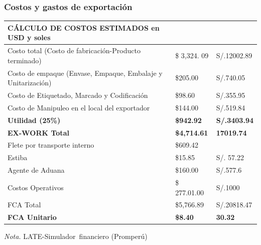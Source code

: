 \documentclass[
  stu,
  floatsintext,
  longtable,
  a4paper,
  nolmodern,
  notxfonts,
  notimes,
  12pt,
  colorlinks=true,linkcolor=blue,citecolor=blue,urlcolor=blue]{apa7}
\newcounter{none} %
\begin{document}
\subsubsection{Costos y gastos de
exportación}\label{costos-y-gastos-de-exportaciuxf3n}

\begin{table}

{\caption{{Cálculo de costos estimados y precio FCA en
USD}{\label{tbl-mytable2}}}}

{\def\LTcaptype{none} %
\begin{longtable}[]{@{}
  >{\raggedright\arraybackslash}p{}
  >{\raggedright\arraybackslash}p{}
  >{\raggedright\arraybackslash}p{}@{}}
\toprule\noalign{}
\begin{minipage}[b]{\linewidth}\raggedright
CÁLCULO DE COSTOS ESTIMADOS en USD y soles
\end{minipage} & \begin{minipage}[b]{\linewidth}\raggedright
\end{minipage} & \begin{minipage}[b]{\linewidth}\raggedright
\end{minipage} \\
\midrule\noalign{}
\endhead
\bottomrule\noalign{}
\endlastfoot
Costo total (Costo de fabricación-Producto terminado) & \$ 3,324. 09 &
S/.12002.89 \\
Costo de empaque (Envase, Empaque, Embalaje y Unitarización) & \$205.00
& S/.740.05 \\
Costo de Etiquetado, Marcado y Codificación & \$98.60 & S/.355.95 \\
Costo de Manipuleo en el local del exportador & \$144.00 & S/.519.84 \\
\textbf{Utilidad (25\%)} & \textbf{\$942.92} & \textbf{S/.3403.94} \\
\textbf{EX-WORK Total} & \textbf{\$4,714.61} & \textbf{17019.74} \\
Flete por transporte interno & \$609.42 & 250.61 \\
Estiba & \$15.85 & S/. 57.22 \\
Agente de Aduana & \$160.00 & S/.577.6 \\
Costos Operativos & \$ 277.01.00 & S/.1000 \\
FCA Total & \$5,766.89 & S/.20818.47 \\
\textbf{FCA Unitario} & \textbf{\$8.40} & \textbf{30.32} \\
\end{longtable}
}

\noindent \emph{Nota.} LATE-Simulador~financiero (Promperú)

\end{table}
\end{document}
